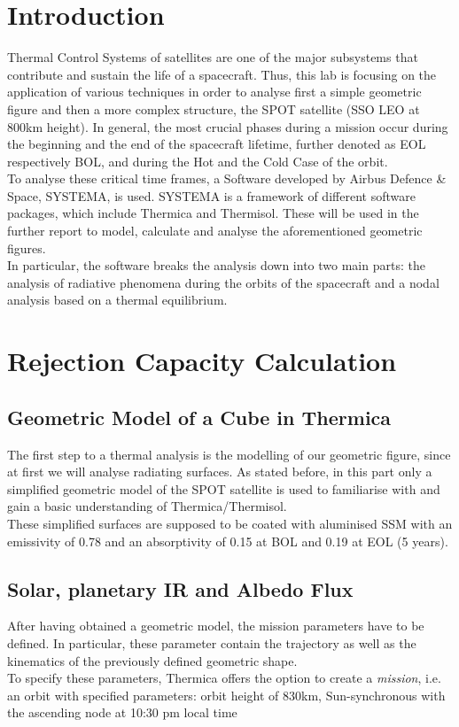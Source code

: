 \section{Introduction}
Thermal Control Systems of satellites are one of the major subsystems that contribute and sustain the life of a spacecraft. Thus, this lab is focusing on the application of various techniques in order to analyse first a simple geometric figure and then a more complex structure, the SPOT satellite (SSO LEO at 800km height). In general, the most crucial phases during a mission occur during the beginning and the end of the spacecraft lifetime, further denoted as EOL respectively BOL, and during the Hot and the Cold Case of the orbit.\\
To analyse these critical time frames, a Software developed by Airbus Defence \& Space, SYSTEMA, is used. SYSTEMA is a framework of different software packages, which include Thermica and Thermisol. These will be used in the further report to model, calculate and analyse the aforementioned geometric figures. \\In particular, the software breaks the analysis down into two main parts: the analysis of radiative phenomena during the orbits of the spacecraft and a nodal analysis based on a thermal equilibrium.

\section{Rejection Capacity Calculation}
\subsection{Geometric Model of a Cube in Thermica}
The first step to a thermal analysis is the modelling of our geometric figure, since at first we will analyse radiating surfaces. As stated before, in this part only a simplified geometric model of the SPOT satellite is used to familiarise with and gain a basic understanding of Thermica/Thermisol.\\
These simplified surfaces are supposed to be coated with aluminised SSM with an emissivity of 0.78 and an absorptivity of 0.15 at BOL and 0.19 at EOL (5 years).
 
\subsection{Solar, planetary IR and Albedo Flux}
After having obtained a geometric model, the mission parameters have to be defined. In particular, these parameter contain the trajectory as well as the kinematics of the previously defined geometric shape.\\
To specify these parameters, Thermica offers the option to create a \textit{mission}, i.e. an orbit with specified parameters: orbit height of 830km, Sun-synchronous with the ascending node at 10:30 pm local time




